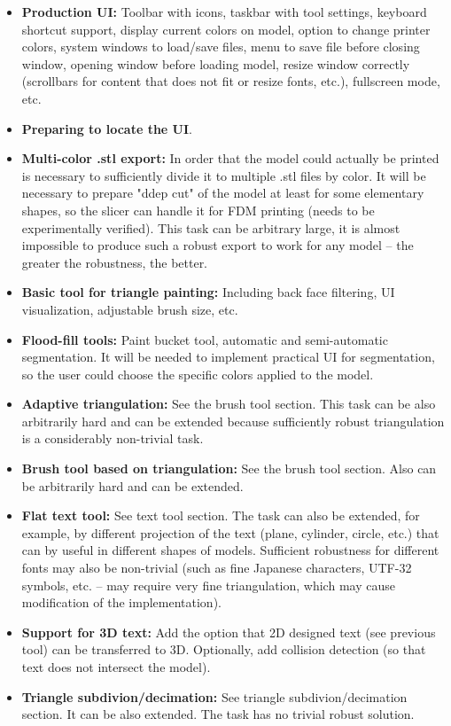 \begin{itemize}
\item \textbf{Production UI:} Toolbar with icons, taskbar with tool settings, keyboard shortcut support, display current colors on model, option to change printer colors, system windows to load/save files, menu to save file before closing window, opening window before loading model, resize window correctly (scrollbars for content that does not fit or resize fonts, etc.), fullscreen mode, etc.
\item \textbf{Preparing to locate the UI}.
\item \textbf{Multi-color .stl export:} In order that the model could actually be printed is necessary to sufficiently divide it to multiple .stl files by color. It will be necessary to prepare "ddep cut" of the model at least for some elementary shapes, so the slicer can handle it for FDM printing (needs to be experimentally verified).  This task can be arbitrary large, it is almost impossible to produce such a robust export to work for any model -- the greater the robustness, the better.
\item \textbf{Basic tool for triangle painting:} Including back face filtering, UI visualization, adjustable brush size, etc.
\item \textbf{Flood-fill tools:} Paint bucket tool, automatic and semi-automatic segmentation. It will be needed to implement practical UI for segmentation, so the user could choose the specific colors applied to the model.
\item \textbf{Adaptive triangulation:} See the brush tool section.  This task can be also arbitrarily hard and can be extended because sufficiently robust triangulation is a considerably non-trivial task.
\item \textbf{Brush tool based on triangulation:} See the brush tool section. Also can be arbitrarily hard and can be extended.
\item \textbf{Flat text tool:} See text tool section. The task can also be extended, for example, by different projection of the text (plane, cylinder, circle, etc.) that can by useful in different shapes of models.  Sufficient robustness for different fonts may also be non-trivial (such as fine Japanese characters, UTF-32 symbols, etc. -- may require very fine triangulation, which may cause modification of the implementation).
\item \textbf{Support for 3D text:} Add the option that 2D designed text (see previous tool) can be transferred to 3D. Optionally, add collision detection (so that text does not intersect the model).
\item \textbf{Triangle subdivion/decimation:} See triangle subdivion/decimation section. It can be also extended. The task has no trivial robust solution.
\end{itemize}



